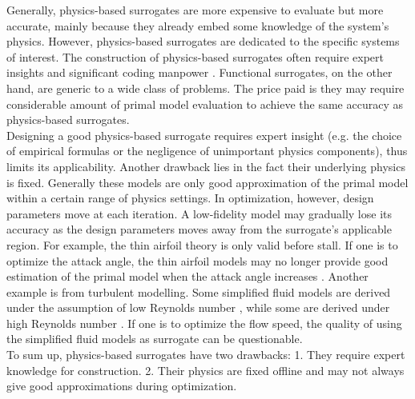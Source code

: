 \documentclass[a4paper,onecolumn]{article}
\theoremstyle{remark}
\begin{document}
\noindent Generally, physics-based surrogates are more expensive to evaluate but more accurate,
mainly because they already embed some knowledge of the system's physics. 
However, physics-based surrogates are dedicated to the specific systems of interest.
The construction of physics-based surrogates often require expert insights
and significant coding manpower \cite{Opt Koziel Book}. 
Functional surrogates, on the other hand, are generic to a wide class of problems.
The price paid is they may require considerable amount of primal model evaluation 
to achieve the same accuracy as physics-based surrogates. \\

\noindent Designing a good physics-based surrogate requires expert insight
(e.g. the choice of empirical formulas or the negligence of unimportant physics components),
thus limits its applicability. Another drawback lies in the fact their underlying
physics is fixed. Generally these models are only good approximation of the primal model
within a certain range of physics settings. In optimization, however, design parameters 
move at each iteration. A low-fidelity model may gradually lose its accuracy 
as the design parameters moves away from the surrogate's applicable region.
For example, the thin airfoil theory is only valid before stall. 
If one is to optimize the attack angle, the thin airfoil models may no longer 
provide good estimation of the primal model when the attack angle increases \cite{thin airfoil}.
Another example is from turbulent modelling.
Some simplified fluid models are derived under the assumption of low Reynolds number
\cite{turbulent modeling R low}, while some are derived under high Reynolds number 
\cite{turbulent modeling R high}.
If one is to optimize the flow speed, the quality of using the simplified fluid models
as surrogate can be questionable.\\

\noindent To sum up, physics-based surrogates have two drawbacks:
1. They require expert knowledge for construction. 2. Their physics are fixed offline
and may not always give good approximations during optimization.\\
\end{document}
